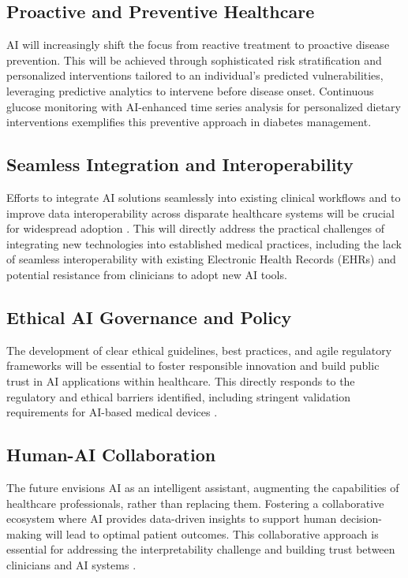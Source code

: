 \documentclass[runningheads]{llncs}
\begin{document}
\subsection{Proactive and Preventive Healthcare}
AI will increasingly shift the focus from reactive treatment to proactive disease prevention. This will be achieved through sophisticated risk stratification and personalized interventions tailored to an individual's predicted vulnerabilities, leveraging predictive analytics to intervene before disease onset. Continuous glucose monitoring with AI-enhanced time series analysis for personalized dietary interventions \cite{article_9} exemplifies this preventive approach in diabetes management.

\subsection{Seamless Integration and Interoperability}
Efforts to integrate AI solutions seamlessly into existing clinical workflows and to improve data interoperability across disparate healthcare systems will be crucial for widespread adoption \cite{muhammad2024artificial, singh2024comprehensive}. This will directly address the practical challenges of integrating new technologies into established medical practices, including the lack of seamless interoperability with existing Electronic Health Records (EHRs) and potential resistance from clinicians to adopt new AI tools.

\subsection{Ethical AI Governance and Policy}
The development of clear ethical guidelines, best practices, and agile regulatory frameworks will be essential to foster responsible innovation and build public trust in AI applications within healthcare. This directly responds to the regulatory and ethical barriers identified, including stringent validation requirements for AI-based medical devices \cite{article_20, article_21}.

\subsection{Human-AI Collaboration}
The future envisions AI as an intelligent assistant, augmenting the capabilities of healthcare professionals, rather than replacing them. Fostering a collaborative ecosystem where AI provides data-driven insights to support human decision-making will lead to optimal patient outcomes. This collaborative approach is essential for addressing the interpretability challenge and building trust between clinicians and AI systems \cite{future_healthcare_professionals_2024}.
\end{document}
